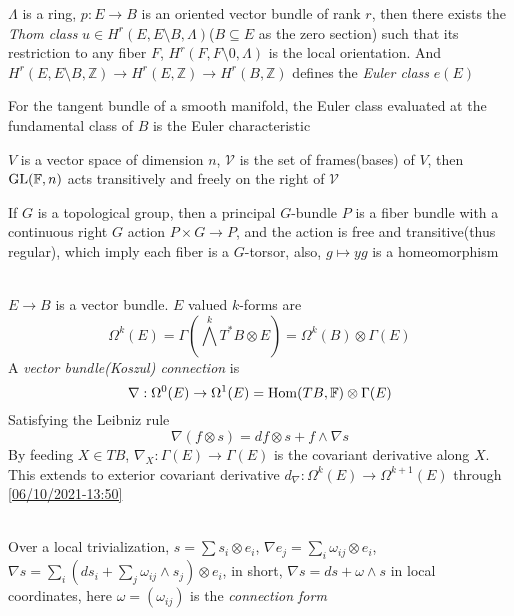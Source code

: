 \documentclass[main]{subfiles}
\begin{document}
\begin{theorem}
$\Lambda$ is a ring, $p:E\to B$ is an oriented vector bundle of rank $r$, then there exists the \textit{Thom class} $u\in H^r(E,E\setminus B,\Lambda)$($B\subseteq E$ as the zero section) such that its restriction to any fiber $F$, $H^r(F,F\setminus0,\Lambda)$ is the local orientation. And $H^r(E,E\setminus B,\mathbb Z)\to H^r(E,\mathbb Z)\to H^r(B,\mathbb Z)$ defines the \textit{Euler class} $e(E)$

For the tangent bundle of a smooth manifold, the Euler class evaluated at the fundamental class of $B$ is the Euler characteristic
\end{theorem}
\fi

\begin{lemma}
$V$ is a vector space of dimension $n$, $\mathscr V$ is the set of frames(bases) of $V$, then $\operatorname{GL}(\mathbb F,n)$ acts transitively and freely on the right of $\mathscr V$
\end{lemma}

\begin{definition}
If $G$ is a topological group, then a principal $G$-bundle $P$ is a fiber bundle with a continuous right $G$ action $P\times G\to P$, and the action is free and transitive(thus regular), which imply each fiber is a $G$-torsor, also, $g\mapsto yg$ is a homeomorphism
\end{definition}

\begin{definition} \hfill\\
$E\to B$ is a vector bundle. $E$ valued $k$-forms are
\[\Omega^k(E)=\Gamma\left(\textstyle\bigwedge^kT^*B\otimes E\right)=\Omega^k(B)\otimes\Gamma(E)\]
A \textit{vector bundle(Koszul) connection} is
\[\nabla:\Omega^0(E)\to\Omega^1(E)=\operatorname{Hom}(TB,\mathbb F)\otimes\Gamma(E)\]
Satisfying the Leibniz rule
\begin{equation}\label{06/10/2021-13:50}
\nabla (f\otimes s)=df\otimes s+f\wedge\nabla s
\end{equation}
By feeding $X\in TB$, $\nabla_X:\Gamma(E)\to\Gamma(E)$ is the covariant derivative along $X$. This extends to exterior covariant derivative $d_\nabla:\Omega^k(E)\to\Omega^{k+1}(E)$ through \eqref{06/10/2021-13:50}
\end{definition}

\begin{definition} \hfill\\
Over a local trivialization, $s=\sum s_i\otimes e_i$, $\nabla e_j=\sum_i\omega_{ij}\otimes e_i$, $\nabla s=\sum_i(ds_i+\sum_j\omega_{ij}\wedge s_j)\otimes e_i$, in short, $\nabla s=ds+\omega\wedge s$ in local coordinates, here $\omega=(\omega_{ij})$ is the \textit{connection form}
\end{definition}
\end{document}
